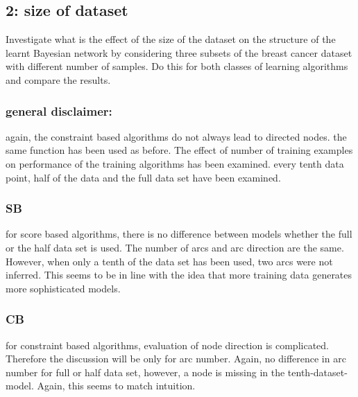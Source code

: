 \documentclass[]{article}
\begin{document}
\clearpage

\subsection{2: size of dataset}\label{size-of-dataset}

Investigate what is the effect of the size of the dataset on the
structure of the learnt Bayesian network by considering three subsets of
the breast cancer dataset with different number of samples. Do this for
both classes of learning algorithms and compare the results.

\subsubsection{general disclaimer:}\label{general-disclaimer}

again, the constraint based algorithms do not always lead to directed
nodes. the same function has been used as before. The effect of number
of training examples on performance of the training algorithms has been
examined. every tenth data point, half of the data and the full data set
have been examined.

\subsubsection{SB}\label{sb}

for score based algorithms, there is no difference between models
whether the full or the half data set is used. The number of arcs and
arc direction are the same. However, when only a tenth of the data set
has been used, two arcs were not inferred. This seems to be in line with
the idea that more training data generates more sophisticated models.

\subsubsection{CB}\label{cb}

for constraint based algorithms, evaluation of node direction is
complicated. Therefore the discussion will be only for arc number.
Again, no difference in arc number for full or half data set, however, a
node is missing in the tenth-dataset-model. Again, this seems to match
intuition.
\end{document}
